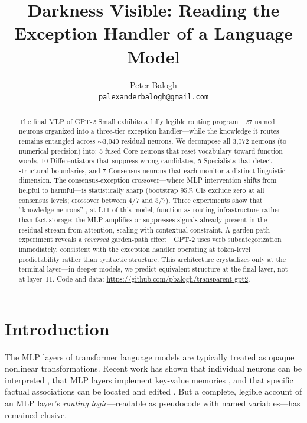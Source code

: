 \documentclass{article}
\title{Darkness Visible: Reading the Exception Handler of a Language Model}
\author{
  Peter Balogh \\
  \texttt{palexanderbalogh@gmail.com}
}
\begin{document}
\maketitle

\begin{abstract}
The final MLP of GPT-2 Small exhibits a fully legible routing
program---27 named neurons organized into a three-tier exception handler---while
the knowledge it routes remains entangled across $\sim$3{,}040 residual neurons.
We decompose all 3{,}072 neurons (to numerical precision) into:
5 fused Core neurons that reset vocabulary toward function words,
10 Differentiators that suppress wrong candidates,
5 Specialists that detect structural boundaries, and
7 Consensus neurons that each monitor a distinct linguistic dimension.
The consensus-exception crossover---where MLP intervention shifts from helpful
to harmful---is statistically sharp (bootstrap 95\% CIs exclude zero at
all consensus levels; crossover between 4/7 and 5/7).
Three experiments show that ``knowledge neurons'' \citep{dai2022knowledge},
at L11 of this model, function as routing infrastructure rather than fact
storage: the MLP amplifies or suppresses signals already present in the
residual stream from attention, scaling with contextual constraint.
A garden-path experiment reveals a \emph{reversed} garden-path effect---GPT-2
uses verb subcategorization immediately, consistent with the exception handler
operating at token-level predictability rather than syntactic structure.
This architecture crystallizes only at the terminal layer---in deeper models,
we predict equivalent structure at the final layer, not at layer~11.
Code and data: \url{https://github.com/pbalogh/transparent-gpt2}.
\end{abstract}

\section{Introduction}

The MLP layers of transformer language models are typically treated as opaque
nonlinear transformations.
Recent work has shown that individual neurons can be interpreted
\citep{gurnee2023finding, bricken2023monosemanticity}, that MLP layers implement
key-value memories \citep{geva2021transformer}, and that specific factual
associations can be located and edited \citep{meng2022locating}.
But a complete, legible account of an MLP layer's \emph{routing logic}---readable
as pseudocode with named variables---has remained elusive.
\end{document}
